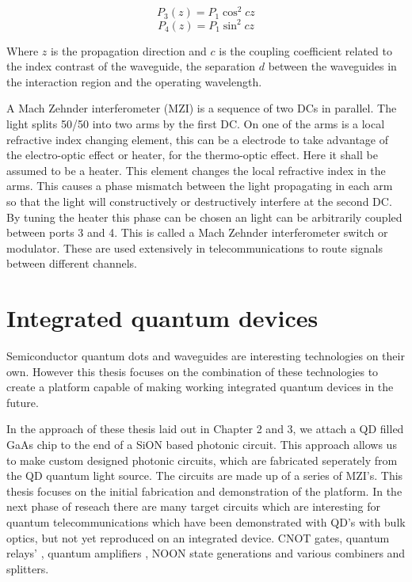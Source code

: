 \begin{equation} P_3(z) = P_1 \cos^2 cz \end{equation} \begin{equation} P_4(z) =
P_1 \sin^2 cz \end{equation}

Where $z$ is the propagation direction and $c$ is the coupling coefficient
related to the index contrast of the waveguide, the separation $d$ between the
waveguides in the interaction region and the operating wavelength.

A Mach Zehnder interferometer (MZI) is a sequence of two DCs in parallel. The light
splits 50/50 into two arms by the first DC. On one of the arms is a local
refractive index changing element, this can be a electrode to take advantage of
the electro-optic effect or heater, for the thermo-optic effect. Here it shall
be assumed to be a heater. This element changes the local refractive index in
the arms. This causes a phase mismatch between the light propagating in each arm
so that the light will constructively or destructively interfere at the second
DC. By tuning the heater this phase can be chosen an light can be arbitrarily
coupled between ports 3 and 4. This is called a Mach Zehnder interferometer
switch or modulator. These are used extensively in telecommunications to route
signals between different channels.

\section{Integrated quantum devices}

Semiconductor quantum dots and waveguides are interesting technologies on their own. However this thesis focuses
on the combination of these technologies to create a platform capable of making working integrated quantum
devices in the future.

In the approach of these thesis laid out in Chapter 2 and 3, we attach a QD filled GaAs chip to the end of a SiON
based photonic circuit. This approach allows us to make custom designed photonic circuits, which are fabricated
seperately from the QD quantum light source. The circuits are made up of a series of MZI's. This thesis focuses on
the initial fabrication and demonstration of the platform. In the next phase of reseach there are many target circuits
which are interesting for quantum telecommunications which have been demonstrated with QD's with bulk optics, but
not yet reproduced on an integrated device. CNOT gates\cite{cnotpooley}, quantum relays' \cite{varnava2015entangled},
quantum amplifiers \cite{kocsis2013heralded, zavatta2011high}, NOON state generations \cite{bennett2015cavity} and various combiners and splitters.

